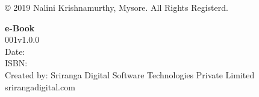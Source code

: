 \thispagestyle{empty}

© 2019 Nalini Krishnamurthy, Mysore. All Rights Registerd.

 \textbf{e-Book}\\
 001v1.0.0\\
 Date: \\
 ISBN: \\
 Created by: Sriranga Digital Software Technologies Private Limited\\srirangadigital.com

